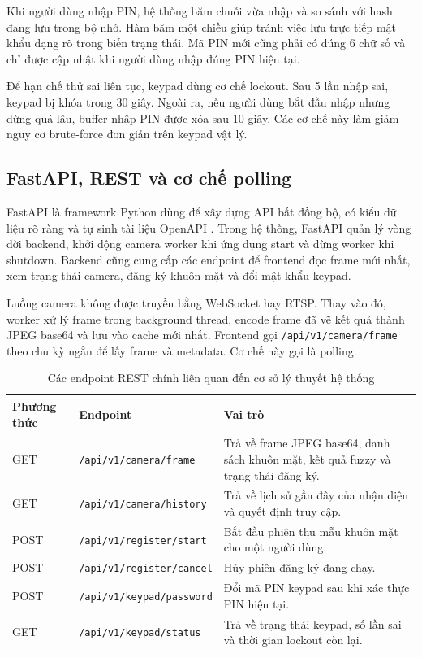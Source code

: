 Khi người dùng nhập PIN, hệ thống băm chuỗi vừa nhập và so sánh với hash đang lưu trong bộ nhớ. Hàm băm một chiều giúp tránh việc lưu trực tiếp mật khẩu dạng rõ trong biến trạng thái. Mã PIN mới cũng phải có đúng 6 chữ số và chỉ được cập nhật khi người dùng nhập đúng PIN hiện tại.

Để hạn chế thử sai liên tục, keypad dùng cơ chế lockout. Sau 5 lần nhập sai, keypad bị khóa trong 30 giây. Ngoài ra, nếu người dùng bắt đầu nhập nhưng dừng quá lâu, buffer nhập PIN được xóa sau 10 giây. Các cơ chế này làm giảm nguy cơ brute-force đơn giản trên keypad vật lý.

\subsection{FastAPI, REST và cơ chế polling}

FastAPI là framework Python dùng để xây dựng API bất đồng bộ, có kiểu dữ liệu rõ ràng và tự sinh tài liệu OpenAPI \cite{fastapi}. Trong hệ thống, FastAPI quản lý vòng đời backend, khởi động camera worker khi ứng dụng start và dừng worker khi shutdown. Backend cũng cung cấp các endpoint để frontend đọc frame mới nhất, xem trạng thái camera, đăng ký khuôn mặt và đổi mật khẩu keypad.

Luồng camera không được truyền bằng WebSocket hay RTSP. Thay vào đó, worker xử lý frame trong background thread, encode frame đã vẽ kết quả thành JPEG base64 và lưu vào cache mới nhất. Frontend gọi \texttt{/api/v1/camera/frame} theo chu kỳ ngắn để lấy frame và metadata. Cơ chế này gọi là polling.

\begin{table}[H]
\centering
\caption{Các endpoint REST chính liên quan đến cơ sở lý thuyết hệ thống}
\label{tab:rest_theory_endpoints}
\begin{tabular}{|l|l|p{6.2cm}|}
\hline
\textbf{Phương thức} & \textbf{Endpoint} & \textbf{Vai trò} \\
\hline
GET & \texttt{/api/v1/camera/frame} & Trả về frame JPEG base64, danh sách khuôn mặt, kết quả fuzzy và trạng thái đăng ký. \\
\hline
GET & \texttt{/api/v1/camera/history} & Trả về lịch sử gần đây của nhận diện và quyết định truy cập. \\
\hline
POST & \texttt{/api/v1/register/start} & Bắt đầu phiên thu mẫu khuôn mặt cho một người dùng. \\
\hline
POST & \texttt{/api/v1/register/cancel} & Hủy phiên đăng ký đang chạy. \\
\hline
POST & \texttt{/api/v1/keypad/password} & Đổi mã PIN keypad sau khi xác thực PIN hiện tại. \\
\hline
GET & \texttt{/api/v1/keypad/status} & Trả về trạng thái keypad, số lần sai và thời gian lockout còn lại. \\
\hline
\end{tabular}
\end{table}

